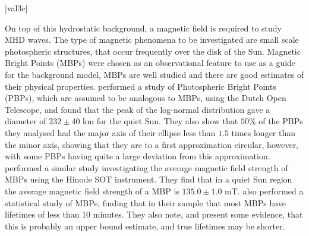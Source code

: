 \py[chapter3]|val3c|

On top of this hydrostatic background, a magnetic field is required to study MHD waves.
The type of magnetic phenomena to be investigated are small scale photospheric structures, that occur frequently over the disk of the Sun.
Magnetic Bright Points (MBPs) were chosen as an observational feature to use as a guide for the background model, MBPs are well studied and there are good estimates of their physical properties.
\cite{feng2013} performed a study of Photospheric Bright Points (PBPs), which are assumed to be analogous to MBPs, using the Dutch Open Telescope, and found that the peak of the log-normal distribution gave a diameter of $232\pm40$ km for the quiet Sun.
They also show that $50$\% of the PBPs they analysed had the major axis of their ellipse less than $1.5$ times longer than the minor axis, showing that they are to a first approximation circular, however, with some PBPs having quite a large deviation from this approximation.
\cite{utz2013} performed a similar study investigating the average magnetic field strength of MBPs using the Hinode SOT instrument.
They find that in a quiet Sun region the average magnetic field strength of a MBP is $135.0 \pm 1.0$ mT.
\cite{sanchezalmeida2004} also performed a statistical study of MBPs, finding that in their sample that most MBPs have lifetimes of less than 10 minutes.
They also note, and present some evidence, that this is probably an upper bound estimate, and true lifetimes may be shorter.


